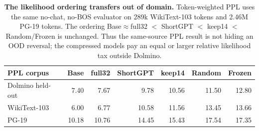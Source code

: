 \begin{table}[t]
\centering
\scriptsize
\setlength{\tabcolsep}{4.2pt}
\begin{tabular}{@{}lrrrrrr@{}}
\toprule
\textbf{PPL corpus} & \textbf{Base} & \textbf{full32} &
\textbf{ShortGPT} & \textbf{keep14} & \textbf{Random} &
\textbf{Frozen} \\
\midrule
Dolmino held-out & 7.40 & 7.67 & 9.78 & 10.56 & 11.50 & 12.80 \\
WikiText-103 & 6.00 & 6.77 & 10.58 & 11.56 & 13.45 & 13.66 \\
PG-19 & 10.18 & 10.76 & 14.45 & 15.43 & 17.54 & 17.35 \\
\bottomrule
\end{tabular}
\caption{\textbf{The likelihood ordering transfers out of domain.}
Token-weighted PPL uses the same no-chat, no-BOS evaluator on 289k
WikiText-103 tokens and 2.46M PG-19 tokens. The ordering
Base$\approx$full32 $<$ ShortGPT $<$ keep14 $<$ Random/Frozen is unchanged.
Thus the same-source PPL result is not hiding an OOD reversal; the compressed
models pay an equal or larger relative likelihood tax outside Dolmino.}
\label{tab:ood-audit}
\end{table}
